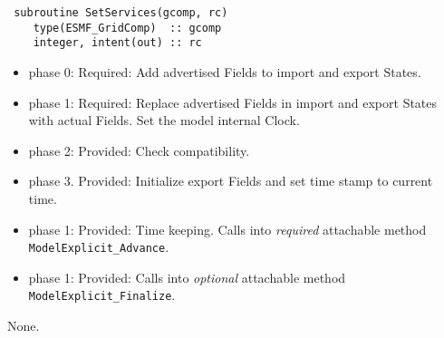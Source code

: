 \begin{verbatim} subroutine SetServices(gcomp, rc)
    type(ESMF_GridComp)  :: gcomp
    integer, intent(out) :: rc
\end{verbatim} 

\begin{itemize}
\item phase 0: {\sc Required:} Add advertised Fields to import and export States.
\item phase 1: {\sc Required:} Replace advertised Fields in import and export States with actual Fields. Set the model internal Clock.
\item phase 2: {\sc Provided:} Check compatibility.
\item phase 3. {\sc Provided:} Initialize export Fields and set time stamp to current time.
\end{itemize}

\begin{itemize}
\item phase 1: {\sc Provided:} Time keeping. Calls into {\em required} attachable method {\tt ModelExplicit\_Advance}.
\end{itemize}

\begin{itemize}
\item phase 1: {\sc Provided:} Calls into {\em optional} attachable method {\tt ModelExplicit\_Finalize}.
\end{itemize}

{\sc None.}

